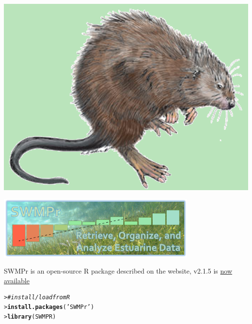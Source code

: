 \documentclass[serif]{beamer}\usepackage[]{graphicx}\usepackage[]{color}
\makeatletter
\newcommand{\hlstr}[1]{\textcolor[rgb]{0.192,0.494,0.8}{#1}}%
\newcommand{\hlcom}[1]{\textcolor[rgb]{0.678,0.584,0.686}{\textit{#1}}}%
\newcommand{\hlstd}[1]{\textcolor[rgb]{0.345,0.345,0.345}{#1}}%
\newcommand{\hlkwd}[1]{\textcolor[rgb]{0.737,0.353,0.396}{\textbf{#1}}}%
\newenvironment{kframe}{%
 \def\at@end@of@kframe{}%
 \ifinner\ifhmode%
  \def\at@end@of@kframe{\end{minipage}}%
  \begin{minipage}{\columnwidth}%
 \fi\fi%
 \def\FrameCommand##1{\hskip\@totalleftmargin \hskip-\fboxsep
 \colorbox{shadecolor}{##1}\hskip-\fboxsep
     \hskip-\linewidth \hskip-\@totalleftmargin \hskip\columnwidth}%
 \MakeFramed {\advance\hsize-\width
   \@totalleftmargin\z@ \linewidth\hsize
   \@setminipage}}%
 {\par\unskip\endMakeFramed%
 \at@end@of@kframe}
\newenvironment{knitrout}{}{} %
\makeatother
\begin{document}
\begin{frame}[fragile]{\includegraphics[width=0.05\paperwidth]{fig/muskrat.png}\hspace{0.07in}{\bf SWMPrats.net: The SWMPr package}}
\centerline{\includegraphics[width = 0.75\textwidth]{fig/swmpr_logo.png}}
\vspace{0.15in}
SWMPr is an open-source R package described on the website, v2.1.5 is \href{http://cran.r-project.org/web/packages/SWMPr/index.html}{now available}
\begin{knitrout}
\color{fgcolor}\begin{kframe}
\begin{alltt}
\hlstd{> }\hlcom{# install/load from R}
\hlstd{> }\hlkwd{install.packages}\hlstd{(}\hlstr{'SWMPr'}\hlstd{)}
\hlstd{> }\hlkwd{library}\hlstd{(SWMPR)}
\end{alltt}
\end{kframe}
\end{knitrout}
\end{frame}
\end{document}
